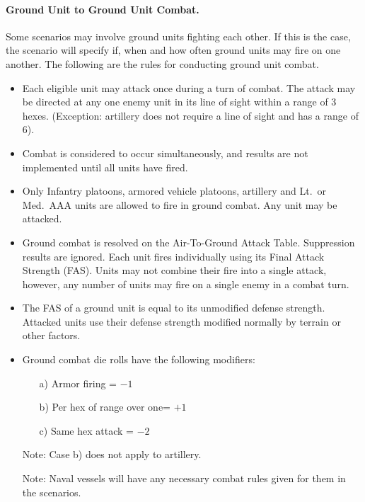 \paragraph{Ground Unit to Ground Unit Combat.} Some scenarios may involve ground units fighting each other. If this is the case, the scenario will specify if, when and how often ground units may fire on one another. The following are the rules for conducting ground unit combat.
\begin{itemize}

    \item Each eligible unit may attack once during a turn of combat. The attack may be directed at any one enemy unit in its line of sight within a range of 3 hexes. (Exception: artillery does not require a line of sight and has a range of 6).

    \item Combat is considered to occur simultaneously, and results are not implemented until all units have fired.
    
    \item Only Infantry platoons, armored vehicle platoons, artillery and Lt.\ or Med.\ AAA units are allowed to fire in ground combat. Any unit may be attacked.

    \item Ground combat is resolved on the Air-To-Ground Attack Table. Suppression results are ignored. Each unit fires individually using its Final Attack Strength (FAS). Units may not combine their fire into a single attack, however, any number of units may fire on a single enemy in a combat turn.

    \item The FAS of a ground unit is equal to its unmodified defense strength. Attacked units use their defense strength modified normally by terrain or other factors.

    \item Ground combat die rolls have the following modifiers:
    \begin{enumerate}
        \item[a)] Armor firing = $-1$
        \item[b)] Per hex of range over one= $+1$
        \item[c)] Same hex attack = $-2$
    \end{enumerate}

    Note: Case b) does not apply to artillery.

    Note: Naval vessels will have any necessary combat rules given for them in the scenarios. 

\end{itemize}


